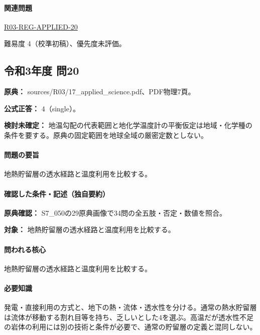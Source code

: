 \paragraph{関連問題} \hyperref[q:r03-reg-applied-20]{R03-REG-APPLIED-20}

\par 難易度 4（校準初稿）、優先度未評価。

\subsection{令和3年度 問20}
\label{q:r03-reg-applied-20}

\noindent\textbf{原典：} sources/R03/17\_applied\_science.pdf、PDF物理7頁。

\textbf{公式正答：} 4（single）。

\par\textbf{検討未確定：} 地温勾配の代表範囲と地化学温度計の平衡仮定は地域・化学種の条件を要する。原典の固定範囲を地球全域の厳密定数としない。

\paragraph{問題の要旨} 地熱貯留層の透水経路と温度利用を比較する。

\paragraph{確認した条件・記述（独自要約）}\mbox{}\par

\noindent\textbf{原典確認：} S7\_050の29原典画像で34問の全五肢・否定・数値を照合。\par

\noindent\textbf{対象：} 地熱貯留層の透水経路と温度利用を比較する。\par

\paragraph{問われる核心} 地熱貯留層の透水経路と温度利用を比較する。

\paragraph{必要知識} 発電・直接利用の方式と、地下の熱・流体・透水性を分ける。通常の熱水貯留層は流体が移動する割れ目等を持ち、乏しいとした4を選ぶ。高温だが透水性不足の岩体の利用には別の技術と条件が必要で、通常の貯留層の定義と混同しない。

